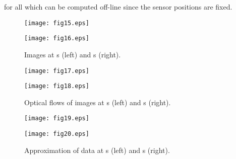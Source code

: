 \documentclass[conference,letterpaper]{ieeeconf}
\begin{document}
for all  which can be computed off-line
since the sensor positions are fixed.






\begin{figure}[t]
\begin{center}
\begin{minipage}{4cm}
\begin{center}
\texttt{[image: fig15.eps]}
\end{center}
\end{minipage}
\hspace{.2cm}
\begin{minipage}{4cm}
\begin{center}
\texttt{[image: fig16.eps]}
\end{center}
\end{minipage}
\caption{Images at s (left) and s (right).}
\label{fig:initial_image}
\bigskip

\begin{minipage}{4cm}
\begin{center}
\texttt{[image: fig17.eps]}
\end{center}
\end{minipage}
\hspace{.2cm}
\begin{minipage}{4cm}
\begin{center}
\texttt{[image: fig18.eps]}
\end{center}
\end{minipage}
\caption{Optical flows of images at s (left) and s (right).}
\label{fig:of_image}
\bigskip

\begin{minipage}{4cm}
\begin{center}
\texttt{[image: fig19.eps]}
\end{center}
\end{minipage}
\hspace{.2cm}
\begin{minipage}{4cm}
\begin{center}
\texttt{[image: fig20.eps]}
\end{center}
\end{minipage}
\caption{Approximation of data at s (left) and s (right).}
\label{fig:curve_fit}
\end{center}
\end{figure}
\end{document}
